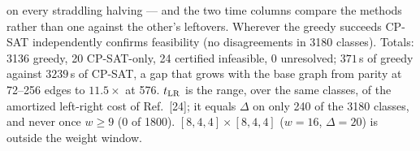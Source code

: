 \begin{table}
{on every straddling halving --- and the two time columns compare the methods
rather than one against the other's leftovers. Wherever the greedy succeeds
CP-SAT independently confirms feasibility (no disagreements in 3180 classes).
Totals: 3136 greedy, 20 CP-SAT-only, 24 certified infeasible, 0 unresolved;
$371$\,s of greedy against $3239$\,s of CP-SAT, a gap that grows with the base
graph from parity at 72--256 edges to $11.5\times$ at 576. $t_{\rm LR}$ is the
range, over the same classes, of the amortized left-right cost of Ref.~[24]; it
equals $\Delta$ on only 240 of the 3180 classes, and never once $w\geq9$ (0 of
1800). $[8,4,4]\times[8,4,4]$ ($w=16$, $\Delta=20$) is outside the weight
window.}
\label{tab:qt-base}
\end{table}

